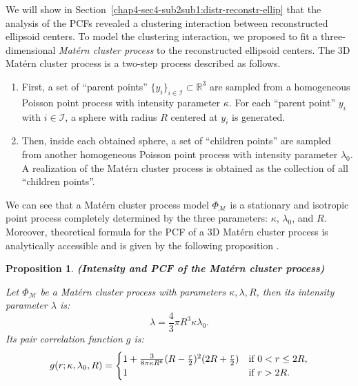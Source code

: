\documentclass[journal]{IEEEtran}
\newcommand{\sidenote}[1]{\textnormal{\textbf{(#1)}}}%
\newtheorem{prop}{Proposition}[section]%
\begin{document}
We will show in Section~\ref{chap4-sec4-sub2sub1:distr-reconstr-ellip}
that the analysis of the PCFs revealed a clustering interaction
between reconstructed ellipsoid centers. To model the clustering
interaction, we proposed to fit a three-dimensional \textit{Mat\'ern
  cluster process} \cite{baddeley2007spatial} to the reconstructed
ellipsoid centers. The 3D Mat\'ern cluster process is a two-step
process described as follows.

\begin{enumerate}

\item First, a set of ``parent points''
  $\{ y_i \}_{i \in \mathcal{I}} \subset \mathbb{R}^3$ are sampled
  from a homogeneous Poisson point process with intensity parameter
  $\kappa$. For each ``parent point'' $y_i$ with $i \in \mathcal{I}$,
  a sphere with radius $R$ centered at $y_i$ is generated.

\item Then, inside each obtained sphere, a set of ``children points''
  are sampled from another homogeneous Poisson point process with
  intensity parameter $\lambda_0$. A realization of the Mat\'ern
  cluster process is obtained as the collection of all ``children
  points''.

\end{enumerate}

We can see that a Mat\'ern cluster process model $\Phi_\mathcal{M}$ is
a stationary and isotropic point process completely determined by the
three parameters: $\kappa$, $\lambda_0$, and $R$. Moreover,
theoretical formula for the PCF of a 3D Mat\'ern cluster process is
analytically accessible and is given by the following proposition
\cite[p376]{illian2008statistical}.

\begin{prop} \sidenote{Intensity and PCF of the Mat\'ern cluster
    process}

  Let $\Phi_{\mathcal{M}}$ be a Mat\'ern cluster process with
  parameters $\kappa, \lambda, R$, then its intensity parameter
  $\lambda$ is:
  \begin{equation}
    \label{eq:matern-inten}
    \lambda = \frac{4}{3}\pi R^3\kappa \lambda_0.
  \end{equation}
  Its pair correlation function $g$ is:
  \begin{equation}
    \label{eq:matern-pcf}
    g(r; \kappa, \lambda_0, R) =
    \begin{cases}
      1 + \frac{3}{8\pi \kappa R^6}(R - \frac{r}{2})^2
      (2R + \frac{r}{2}) & \textnormal{if } 0 < r \leq 2R, \\
      1 & \textnormal{if } r > 2R. \\
    \end{cases}
  \end{equation}
\end{prop}
\end{document}
